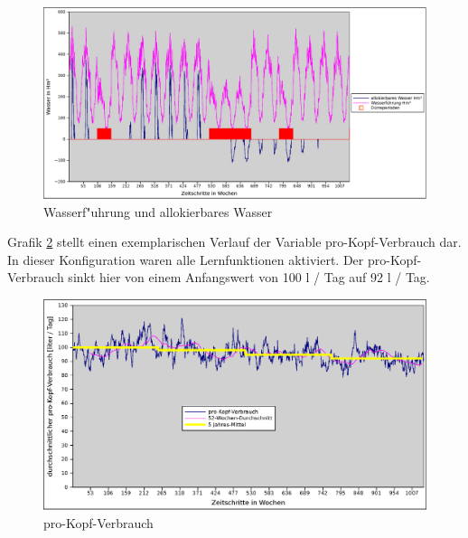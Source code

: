 \documentclass[11pt,a4paper]{article}
\begin{document}
\begin{figure}[h]
\centering
\includegraphics[width=\textwidth]{./ebro-wasser-output}
\caption{Wasserf"uhrung und allokierbares Wasser}
\label{fig:ebro-wasser-output}
\end{figure}



Grafik \ref{fig:demandpc} stellt einen exemplarischen Verlauf der Variable pro-Kopf-Verbrauch dar. In dieser Konfiguration waren alle Lernfunktionen aktiviert. Der pro-Kopf-Verbrauch sinkt hier von einem Anfangswert von 100 l / Tag auf 92 l / Tag.

\begin{figure}[h]
\centering
\includegraphics[width=\textwidth]{./demandpc}
\caption{pro-Kopf-Verbrauch}
\label{fig:demandpc}
\end{figure}
\end{document}

